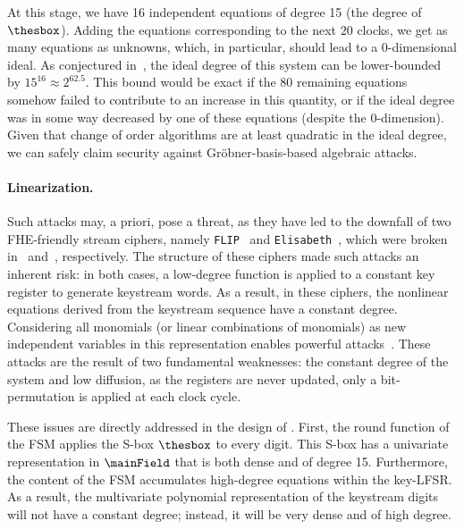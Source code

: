 At this stage, we have 16 independent equations of degree 15 (the degree of $\thesbox$). Adding the equations corresponding to the next $20$ clocks, we get as many equations as unknowns, which, in particular, should lead to a 0-dimensional ideal. As conjectured in~\cite{EPRINT:Perrin24}, the ideal degree of this system can be lower-bounded by $15^{16} \approx 2^{62.5}$. This bound would be exact if the 80 remaining equations somehow failed to contribute to an increase in this quantity, or if the ideal degree was in some way decreased by one of these equations (despite the 0-dimension). Given that change of order algorithms are at least quadratic in the ideal degree, we can safely claim security against Gröbner-basis-based algebraic attacks.



\paragraph{Linearization.}Such attacks may, a priori, pose a threat, as they have led to the downfall of two \gls{FHE}-friendly stream ciphers, namely {\tt FLIP}~\cite{EC:MJSC16} and {\tt Elisabeth}~\cite{AC:CHMS22}, which were broken in~\cite{C:DuvLalRot16} and~\cite{AC:GBJR23}, respectively. The structure of these ciphers made such attacks an inherent risk: in both cases, a low-degree function is applied to a constant key register to generate keystream words.  As a result, in these ciphers, the nonlinear equations derived from the keystream sequence have a constant degree. Considering all monomials (or linear combinations of monomials) as new independent variables in this representation enables powerful attacks~\cite{C:DuvLalRot16,AC:GBJR23}. These attacks are the result of  two fundamental weaknesses: the constant degree of the system and low diffusion, as the registers are never updated, only a bit-permutation is applied at each clock cycle.

These issues are directly addressed in the design of \coolName{}. First, the round function of the FSM applies the S-box \( \thesbox \) to every digit. This S-box has a univariate representation in \( \mainField \) that is both dense and of degree 15. Furthermore, the content of the FSM accumulates high-degree equations within the key-LFSR. As a result, the multivariate polynomial representation of the keystream digits will not have a constant degree; instead, it will be very dense and of high degree.


